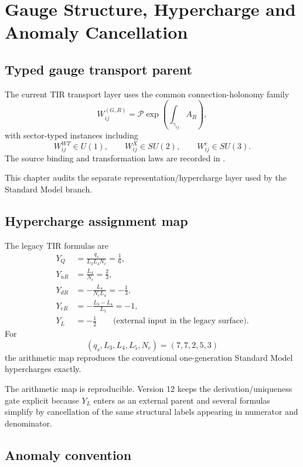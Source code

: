 \chapter[Gauge Structure and Anomalies]{Gauge Structure, Hypercharge and Anomaly Cancellation}
\label{ch:v12_gauge_hypercharge}

\section{Typed gauge transport parent}

The current TIR transport layer uses the common connection-holonomy family
\[
W_{ij}^{(G,R)}
=\mathcal P\exp\!\left(\int_{\gamma_{ij}}A_R\right),
\]
with sector-typed instances including
\[
W_{ij}^{WT}\in U(1),
\qquad
W_{ij}^{X}\in SU(2),
\qquad
W_{ij}^{c}\in SU(3).
\]
The source binding and transformation laws are recorded in
.

This chapter audits the separate representation/hypercharge layer used by the Standard Model branch.

\section{Hypercharge assignment map}

The legacy TIR formulas are
\begin{align}
Y_Q&=\frac{q_s}{L_3L_4N_c}=\frac16,\\
Y_{uR}&=\frac{L_4}{N_c}=\frac23,\\
Y_{dR}&=-\frac{L_4}{N_cL_4}=-\frac13,\\
Y_{eR}&=-\frac{L_3-L_4}{L_5}=-1,\\
Y_L&=-\frac12\qquad\text{(external input in the legacy surface)}.
\end{align}
For
\[
(q_s,L_3,L_4,L_5,N_c)=(7,7,2,5,3)
\]
the arithmetic map reproduces the conventional one-generation Standard Model hypercharges exactly.

The arithmetic map is reproducible. Version 12 keeps the derivation/uniqueness gate explicit because $Y_L$ enters as an external parent and several formulas simplify by cancellation of the same structural labels appearing in numerator and denominator.

\section{Anomaly convention}

